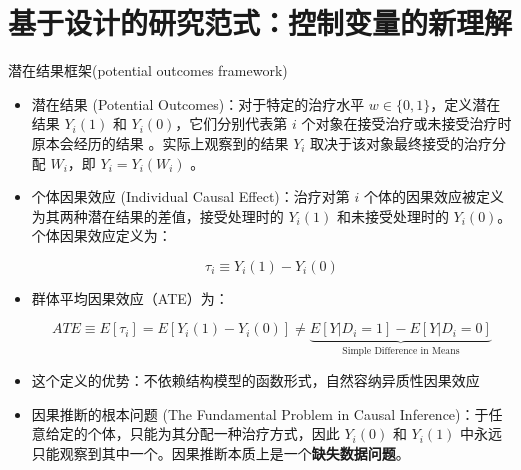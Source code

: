 \section{基于设计的研究范式：控制变量的新理解}


\begin{frame}[allowframebreaks]{潜在结果框架(potential outcomes framework)}
\begin{itemize}
  \item 潜在结果 (Potential Outcomes)：对于特定的治疗水平 $w \in \{0, 1\}$，定义潜在结果 $Y_i(1)$ 和 $Y_i(0)$，它们分别代表第 $i$ 个对象在接受治疗或未接受治疗时原本会经历的结果 。实际上观察到的结果 $Y_i$ 取决于该对象最终接受的治疗分配 $W_i$，即 $Y_i = Y_i(W_i)$ 。
  \item 个体因果效应 (Individual Causal Effect)：治疗对第 $i$ 个体的因果效应被定义为其两种潜在结果的差值，接受处理时的 $Y_i(1)$ 和未接受处理时的 $Y_i(0)$。个体因果效应定义为：

\[\tau_i \equiv Y_i(1) - Y_i(0)\]

\item 群体平均因果效应（ATE）为：

\[
ATE \equiv E[\tau_i] = E[Y_i(1) - Y_i(0)]  \not = \underbrace{E[Y|D_i=1] - E[Y|D_i=0]}_{\text{Simple Difference in Means}}
\]

\item 这个定义的优势：不依赖结构模型的函数形式，自然容纳异质性因果效应
\item 因果推断的根本问题 (The Fundamental Problem in Causal Inference)：于任意给定的个体，只能为其分配一种治疗方式，因此 $Y_i(0)$ 和 $Y_i(1)$ 中永远只能观察到其中一个。因果推断本质上是一个\textbf{缺失数据问题}。
\end{itemize}
\end{frame}


